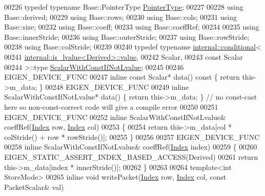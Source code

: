 \begin{DoxyCode}
00226     \textcolor{keyword}{typedef} \textcolor{keyword}{typename} Base::PointerType \hyperlink{class_eigen_1_1internal_1_1_tensor_lazy_evaluator_writable}{PointerType};
00227 
00228     \textcolor{keyword}{using} Base::derived;
00229     \textcolor{keyword}{using} Base::rows;
00230     \textcolor{keyword}{using} Base::cols;
00231     \textcolor{keyword}{using} Base::size;
00232     \textcolor{keyword}{using} Base::coeff;
00233     \textcolor{keyword}{using} Base::coeffRef;
00234 
00235     \textcolor{keyword}{using} Base::innerStride;
00236     \textcolor{keyword}{using} Base::outerStride;
00237     \textcolor{keyword}{using} Base::rowStride;
00238     \textcolor{keyword}{using} Base::colStride;
00239 
00240     \textcolor{keyword}{typedef} \textcolor{keyword}{typename} \hyperlink{struct_eigen_1_1internal_1_1conditional}{internal::conditional}<
00241                     \hyperlink{struct_eigen_1_1internal_1_1is__lvalue}{internal::is\_lvalue<Derived>::value},
00242                     Scalar,
00243                     \textcolor{keyword}{const} Scalar
00244                   >::type \hyperlink{class_eigen_1_1internal_1_1_tensor_lazy_evaluator_writable}{ScalarWithConstIfNotLvalue};
00245 
00246     EIGEN\_DEVICE\_FUNC
00247     \textcolor{keyword}{inline} \textcolor{keyword}{const} Scalar* data()\textcolor{keyword}{ const }\{ \textcolor{keywordflow}{return} this->m\_data; \}
00248     EIGEN\_DEVICE\_FUNC
00249     \textcolor{keyword}{inline} ScalarWithConstIfNotLvalue* data() \{ \textcolor{keywordflow}{return} this->m\_data; \} \textcolor{comment}{// no const-cast here so
       non-const-correct code will give a compile error}
00250 
00251     EIGEN\_DEVICE\_FUNC
00252     \textcolor{keyword}{inline} ScalarWithConstIfNotLvalue& coeffRef(\hyperlink{namespace_eigen_a62e77e0933482dafde8fe197d9a2cfde}{Index} row, \hyperlink{namespace_eigen_a62e77e0933482dafde8fe197d9a2cfde}{Index} col)
00253     \{
00254       \textcolor{keywordflow}{return} this->m\_data[col * colStride() + row * rowStride()];
00255     \}
00256 
00257     EIGEN\_DEVICE\_FUNC
00258     \textcolor{keyword}{inline} ScalarWithConstIfNotLvalue& coeffRef(\hyperlink{namespace_eigen_a62e77e0933482dafde8fe197d9a2cfde}{Index} index)
00259     \{
00260       EIGEN\_STATIC\_ASSERT\_INDEX\_BASED\_ACCESS(Derived)
00261       \textcolor{keywordflow}{return} this->m\_data[index * innerStride()];
00262     \}
00263 
00264     \textcolor{keyword}{template}<\textcolor{keywordtype}{int} StoreMode>
00265     \textcolor{keyword}{inline} \textcolor{keywordtype}{void} writePacket(\hyperlink{namespace_eigen_a62e77e0933482dafde8fe197d9a2cfde}{Index} row, \hyperlink{namespace_eigen_a62e77e0933482dafde8fe197d9a2cfde}{Index} col, \textcolor{keyword}{const} PacketScalar& val)

\end{DoxyCode}
